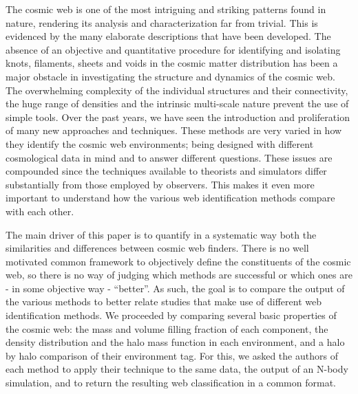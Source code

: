 \documentclass[useAMS,usenatbib]{mnras}
\newcommand{\mcd}[1]{\textcolor{red}{\sout{  #1}}}
\begin{document}
The cosmic web is one of the most intriguing and striking patterns found in nature, rendering
its analysis and characterization far from trivial. This is evidenced by the many elaborate
descriptions that have been developed. The absence of an objective and quantitative procedure for identifying and isolating knots, filaments, sheets and voids in the cosmic matter distribution has been a major obstacle in investigating the structure and dynamics of the cosmic web. The overwhelming complexity of the individual structures and their connectivity, the huge range of densities and the intrinsic multi-scale nature prevent the use of simple tools. Over the past years, we have seen the introduction and proliferation of many new approaches and techniques. These methods are very varied in how they identify the cosmic web environments; being designed with different cosmological data in mind and to answer different questions. These issues are compounded since the techniques available to theorists and simulators differ substantially from those employed by observers. This makes it even more important to understand how the various web identification methods compare with each other.


The main driver of this paper is to quantify in a systematic way both the similarities and differences between cosmic web finders. There is no well motivated common framework to objectively define the constituents of the cosmic web, so there is no way of judging which methods are successful or which ones are  - in some objective way - ``better''. As such, the goal is to compare the output of the various methods to better relate studies that make use of different web identification methods. We proceeded by comparing several basic properties of the cosmic web: the mass and volume filling fraction of each component, the density distribution and the halo mass function in each environment, and a halo by halo comparison of their environment tag. For this, we asked the authors of each method to apply their technique to the same data, the output of an N-body simulation, and to return the resulting web classification in a common format.

\end{document}
